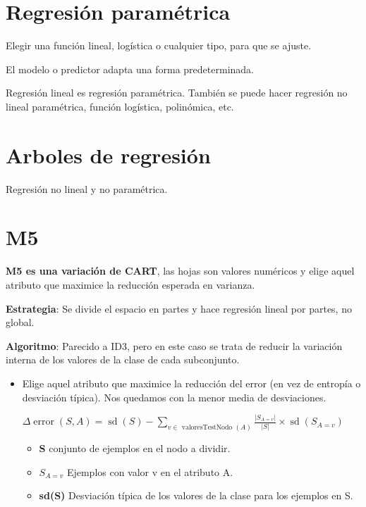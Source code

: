 \documentclass[12pt]{report} %
\begin{document}
\section{Regresión paramétrica}

Elegir una función lineal, logística o cualquier tipo, para que se
ajuste.

El modelo o predictor adapta una forma predeterminada.

Regresión lineal es regresión paramétrica. También se puede hacer
regresión no lineal paramétrica, función logística, polinómica, etc.

\section{Arboles de regresión}

Regresión no lineal y no paramétrica.

\section{M5}

\textbf{M5 es una variación de CART}, las hojas son valores numéricos y
elige aquel atributo que maximice la reducción esperada en varianza.

\textbf{Estrategia}: Se divide el espacio en partes y hace regresión
lineal por partes, no global.

\textbf{Algoritmo}: Parecido a ID3, pero en este caso se trata de
reducir la variación interna de los valores de la clase de cada
subconjunto.

\begin{itemize}
\item
  Elige aquel atributo que maximice la reducción del error (en vez de
  entropía o desviación típica). Nos quedamos con la menor media de
  desviaciones.

  \(\Delta \operatorname{error}(S, A)=\operatorname{sd}(S)-\sum_{v \in \text { valoresTestNodo }(A)} \frac{\left|S_{A=v}\right|}{|S|} \times \operatorname{sd}\left(S_{A=v}\right)\)

  \begin{itemize}
  
  \item
    \textbf{S} conjunto de ejemplos en el nodo a dividir.
  \item
    \textbf{\(S_{A=v}\)} Ejemplos con valor v en el atributo A.
  \item
    \textbf{sd(S)} Desviación típica de los valores de la clase para los
    ejemplos en S.
  \end{itemize}
\end{itemize}
\end{document}
